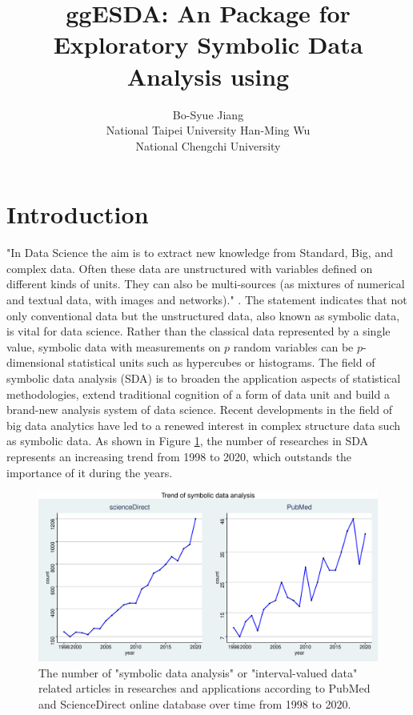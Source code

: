 \documentclass[article]{jss}
\author{Bo-Syue Jiang\\National Taipei University
\And Han-Ming Wu\\National Chengchi University}
\title{ggESDA: An \proglang{R} Package for Exploratory Symbolic Data Analysis using \pkg{ggplot2}}
\newcommand{\imgdir}{../../../paperImage/}
\begin{document}
\section{Introduction}
"In Data Science the aim is to extract new knowledge from Standard, Big, and complex data. Often these data are unstructured with variables defined on different kinds of units. They can also be multi-sources (as mixtures of numerical and textual data, with images and networks)." \cite{Diday:2018}. The statement indicates that not only conventional data but the unstructured data, also known as symbolic data, is vital for data science. Rather than the classical data represented by a single value, symbolic data with measurements on $p$ random variables can be $p$-dimensional statistical units such as hypercubes or histograms. The field of symbolic data analysis (SDA) \cite{Billard+Diday:2007} is to broaden the application aspects of statistical methodologies, extend traditional cognition of a form of data unit and build a brand-new analysis system of data science. Recent developments in the field of big data analytics have led to a renewed interest in complex structure data such as symbolic data. As shown in Figure \ref{fig:trend}, the number of researches in SDA represents an increasing trend from 1998 to 2020, which outstands the importance of it during the years.



\begin{figure}[h]	
  		\centering	 			 	 
\includegraphics{ggESDA_Jiang&Wu_20210915-TrendFig}
  		\caption{The number of "symbolic data analysis" or "interval-valued data" related articles in researches and applications according to PubMed and ScienceDirect online database over time from 1998 to 2020.}   		
  		\label{fig:trend}   			 		 
\end{figure}
\end{document}
